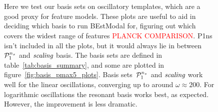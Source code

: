 \begin{figure}[!pth]
\centering
{}\\
\\
\caption{
    Here we test our basis sets on oscillatory templates, which are a good proxy for feature models.
    These plots are useful to aid in deciding which basis to run BEstModal for,
    figuring out which covers the widest range of features \textcolor{red}{PLANCK COMPARISON}.
    P1ns isn't included in all the plots, but it would always lie in between~$\mathcal{P}^{n_s}_1$ and $\textit{scaling}$ basis.
    The basis sets are defined in table~\ref{tab:basis_summary},
    and some are plotted in figure~\ref{fig:basis_pmax5_plots}.
    Basis sets~$\mathcal{P}^{n_s}_1$ and $\textit{scaling}$ work well for the linear oscillations,
    converging up to around $\omega\approx200$.
    For logarithmic oscillations the resonant basis works best, as expected.
    However, the improvement is less dramatic.
    }\label{fig:plot_freq_scan}
\end{figure}
